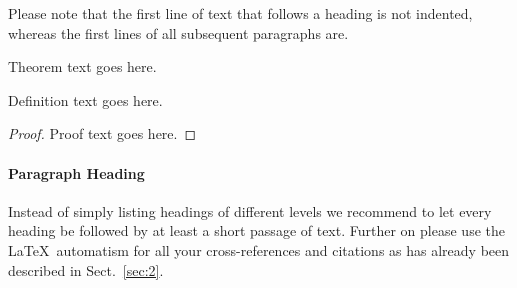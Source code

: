 \documentclass[graybox]{SNmult}
\begin{document}
Please note that the first line of text that follows a heading is not indented, whereas the first lines of all subsequent paragraphs are.


\begin{theorem}
Theorem text goes here.
\end{theorem}
%
%
\begin{definition}
Definition text goes here.
\end{definition}

\begin{proof}
Proof text goes here.
\end{proof}

\paragraph{Paragraph Heading} %
Instead of simply listing headings of different levels we recommend to let every heading be followed by at least a short passage of text.  Further on please use the \LaTeX\ automatism for all your cross-references and citations as has already been described in Sect.~\ref{sec:2}.
\end{document}
